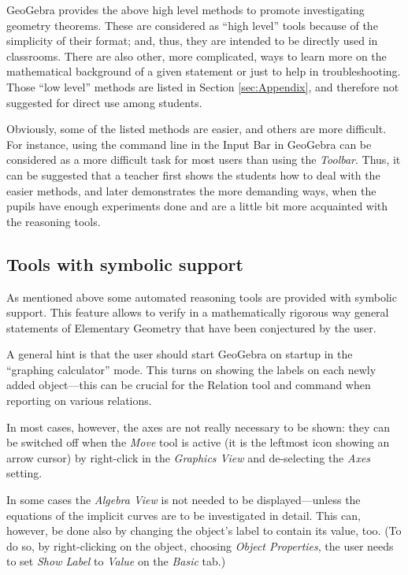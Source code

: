 \documentclass{article}
\begin{document}
GeoGebra provides the above high level methods to promote investigating geometry theorems. These are considered as ``high level'' tools because of the simplicity of their  format; and, thus,  they are intended to  be directly used in classrooms. There are also other, more complicated, ways to learn more on the mathematical background of a given statement or just to help in troubleshooting. Those ``low level'' methods are listed in Section \ref{sec:Appendix}, and therefore not suggested for direct use among students.

Obviously, some of the listed methods are easier, and others are more difficult. For instance, using the command line in the Input Bar in GeoGebra can be considered as a more difficult task for most users than using the \textit{Toolbar}. Thus, it can be suggested that a teacher first shows the students how to deal with the easier methods, and later demonstrates the more demanding ways,  when the pupils have enough experiments done and are a little bit more acquainted with the reasoning tools.

\subsection{Tools with symbolic support}

As mentioned above some automated reasoning tools are provided with symbolic support. This feature allows to verify in a mathematically rigorous way general statements of Elementary Geometry that have been conjectured by the user.

A general hint is that the user should start GeoGebra on startup in the ``graphing calculator'' mode. This turns on showing the labels on each newly added object---this can be crucial for the Relation tool and command when reporting on various relations. 

In most cases, however, the axes are not really necessary to be shown: they can be switched off when the \textit{Move} tool is active (it is the leftmost icon showing an arrow cursor) by right-click in the \textit{Graphics View} and de-selecting the \textit{Axes} setting.

In some cases the \textit{Algebra View} is not needed to be displayed---unless the equations of the implicit curves are to be investigated in detail. This can,  however, be done also by changing the object's label to contain its value, too. (To do so, by right-clicking on the object, choosing \textit{Object Properties}, the user needs to set \textit{Show Label} to \textit{Value} on the \textit{Basic} tab.)
\end{document}
